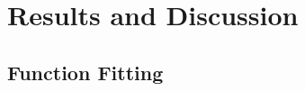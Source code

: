 \documentclass[journal=jacsat,manuscript=article]{achemso}
\begin{document}




\section{Results and Discussion}
\label{section:results_and_discussion}






 



\subsection{Function Fitting}
\end{document}

